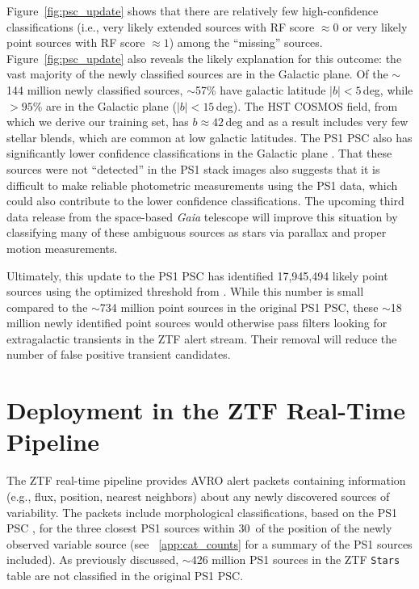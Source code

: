 \documentclass[twocolumn]{aastex63}
\begin{document}
Figure~\ref{fig:psc_update} shows that there are relatively few
high-confidence classifications (i.e., very likely extended sources with RF
score $\approx 0$ or very likely point sources with RF score $\approx 1$)
among the ``missing'' sources. Figure~\ref{fig:psc_update} also reveals the
likely explanation for this outcome: the vast majority of the newly classified
sources are in the Galactic plane. Of the $\sim$144 million newly classified
sources, $\sim$57\% have galactic latitude $\lvert b \rvert < 5$\,deg, while
$> 95$\% are in the Galactic plane ($\lvert b \rvert < 15$\,deg). The HST
COSMOS field, from which we derive our training set, has $b \approx 42$\,deg
and as a result includes very few stellar blends, which are common at low
galactic latitudes. The PS1 PSC also has significantly lower confidence
classifications in the Galactic plane \citep[see Figure~8 in][]{Tachibana18}.
That these sources were not ``detected'' in the PS1 stack images also suggests
that it is difficult to make reliable photometric measurements using the PS1
data, which could also contribute to the lower confidence classifications. The
upcoming third data release from the space-based \textit{Gaia} telescope
\citep{Perryman01} will improve this situation by classifying many of these
ambiguous sources as stars via parallax and proper motion measurements.

Ultimately, this update to the PS1 PSC has identified 17,945,494 likely point
sources using the optimized threshold from \citet[][RF score $\ge
0.83$]{Tachibana18}. While this number is small compared to the $\sim$734
million point sources in the original PS1 PSC, these $\sim$18 million newly
identified point sources would otherwise pass filters looking for
extragalactic transients in the ZTF alert stream. Their removal will reduce
the number of false positive transient candidates.

\section{Deployment in the ZTF Real-Time Pipeline}\label{sec:discussion}

The ZTF real-time pipeline \citep{Masci19} provides AVRO alert packets
\citep[see][]{Patterson19} containing information (e.g., flux, position,
nearest neighbors) about any newly discovered sources of variability. The
packets include morphological classifications, based on the PS1 PSC
\citep{Tachibana18}, for the three closest PS1 sources within 30\arcsec\ of
the position of the newly observed variable source (see ~\ref{app:cat_counts}
for a summary of the PS1 sources included). As previously discussed, $\sim$426
million PS1 sources in the ZTF \texttt{Stars} table are not classified in the
original PS1 PSC.
\end{document}
